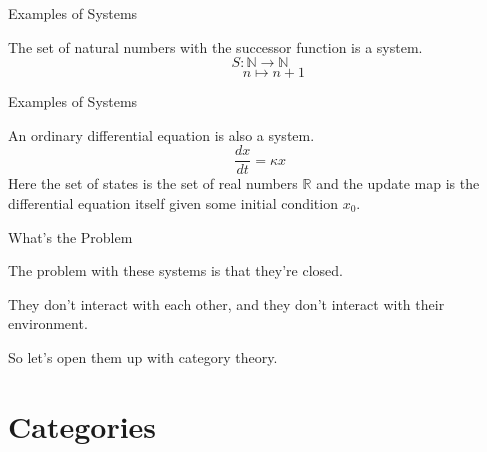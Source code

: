 \documentclass{beamer}
\begin{document}
\begin{frame}{Examples of Systems}
    \begin{large}
        The set of natural numbers with the successor function is a system.
        \vspace*{0.125in}
        \[
            S: \mathbb{N} \rightarrow \mathbb{N}
        \]
        \[
            \ \ \ \ \ \ \ \ \ n \mapsto n+1
        \]
    \end{large}
\end{frame}


\begin{frame}{Examples of Systems}
    \begin{large}
        An ordinary differential equation is also a system.
        \vspace*{0.125in}
        \[
            \frac{dx}{dt}=\kappa x
        \]
        Here the set of states is the set of real numbers $\mathbb{R}$ and the update map is the differential equation itself given some initial condition $x_0$.

    \end{large}

\end{frame}


\begin{frame}{What's the Problem}
    \begin{large}
        The problem with these systems is that they're closed.

        \vspace*{0.25in}
        They don't interact with each other, and they don't interact with their environment.

        \vspace*{0.25in}
        So let's open them up with category theory.
    \end{large}

\end{frame}







\section{Categories}
\end{document}
